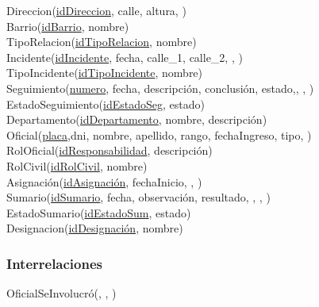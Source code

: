 Direccion(\uline{idDireccion}, calle, altura, )\\

Barrio(\uline{idBarrio}, nombre)\\

TipoRelacion(\uline{idTipoRelacion}, nombre)\\

Incidente(\uline{idIncidente}, fecha, calle\_1, calle\_2,
, )\\

TipoIncidente(\uline{idTipoIncidente}, nombre)\\

Seguimiento(\uline{numero}, fecha, descripción, conclusión,
estado,, , )\\

EstadoSeguimiento(\uline{idEstadoSeg}, estado) \\

Departamento(\uline{idDepartamento}, nombre, descripción)\\

Oficial(\uline{placa},dni, nombre, apellido, rango, fechaIngreso, tipo,
) \\

RolOficial(\uline{idResponsabilidad}, descripción)\\

RolCivil(\uline{idRolCivil}, nombre)\\

Asignación(\uline{idAsignación}, fechaInicio, , )\\

Sumario(\uline{idSumario}, fecha, observación, resultado, ,
, )\\

EstadoSumario(\uline{idEstadoSum}, estado) \\

Designacion(\uline{idDesignación}, nombre) \\

\subsubsection{Interrelaciones}\label{relaciones}

OficialSeInvolucró(, , )\\

